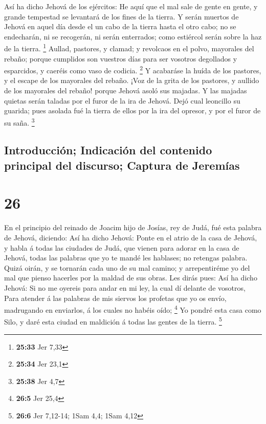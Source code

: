  Así ha dicho Jehová de los ejércitos: He aquí que el mal
sale de gente en gente, y grande tempestad se levantará de los fines de
la tierra.  Y serán muertos de Jehová en aquel día desde
el un cabo de la tierra hasta el otro cabo; no se endecharán, ni se
recogerán, ni serán enterrados; como estiércol serán sobre la haz de la
tierra. \footnote{\textbf{25:33} Jer 7,33}  Aullad,
pastores, y clamad; y revolcaos en el polvo, mayorales del rebaño;
porque cumplidos son vuestros días para ser vosotros degollados y
esparcidos, y caeréis como vaso de codicia. \footnote{\textbf{25:34} Jer
  23,1}  Y acabaráse la huída de los pastores, y el
escape de los mayorales del rebaño.  ¡Voz de la grita de
los pastores, y aullido de los mayorales del rebaño! porque Jehová asoló
sus majadas.  Y las majadas quietas serán taladas por el
furor de la ira de Jehová.  Dejó cual leoncillo su
guarida; pues asolada fué la tierra de ellos por la ira del opresor, y
por el furor de su saña. \footnote{\textbf{25:38} Jer 4,7}

\hypertarget{introducciuxf3n-indicaciuxf3n-del-contenido-principal-del-discurso-captura-de-jeremuxedas}{%
\subsection{Introducción; Indicación del contenido principal del
discurso; Captura de
Jeremías}\label{introducciuxf3n-indicaciuxf3n-del-contenido-principal-del-discurso-captura-de-jeremuxedas}}

\hypertarget{section-25}{%
\section{26}\label{section-25}}

 En el principio del reinado de Joacim hijo de Josías, rey
de Judá, fué esta palabra de Jehová, diciendo:  Así ha
dicho Jehová: Ponte en el atrio de la casa de Jehová, y habla á todas
las ciudades de Judá, que vienen para adorar en la casa de Jehová, todas
las palabras que yo te mandé les hablases; no retengas palabra.
 Quizá oirán, y se tornarán cada uno de su mal camino; y
arrepentiréme yo del mal que pienso hacerles por la maldad de sus obras.
 Les dirás pues: Así ha dicho Jehová: Si no me oyereis
para andar en mi ley, la cual dí delante de vosotros, 
Para atender á las palabras de mis siervos los profetas que yo os envío,
madrugando en enviarlos, á los cuales no habéis oído; \footnote{\textbf{26:5}
  Jer 25,4}  Yo pondré esta casa como Silo, y daré esta
ciudad en maldición á todas las gentes de la tierra. \footnote{\textbf{26:6}
  Jer 7,12-14; 1Sam 4,4; 1Sam 4,12}

